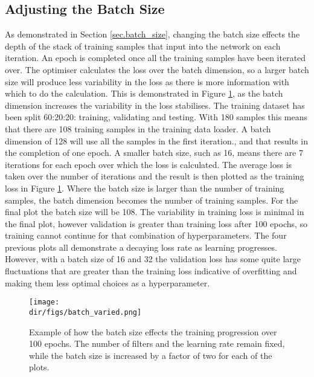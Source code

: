 \subsection{Adjusting the Batch Size}
As demonstrated in Section \ref{sec.batch_size}, changing the batch size effects the depth of the stack of training samples that input into the network on each iteration. An epoch is completed once all the training samples have been iterated over. The optimiser calculates the loss over the batch dimension, so a larger batch size will produce less variability in the loss as there is more information with which to do the calculation. This is demonstrated in Figure \ref{fig.batch_varied}, as the batch dimension increases the variability in the loss stabilises. The training dataset has been split 60:20:20: training, validating and testing. With 180 samples this means that there are 108 training samples in the training data loader. A batch dimension of 128 will use all the samples in the first iteration., and that results in the completion of one epoch. A smaller batch size, such as 16, means there are 7 iterations for each epoch over which the loss is calculated. The average loss is taken over the number of iterations and the result is then plotted as the training loss in Figure \ref{fig.batch_varied}. Where the batch size is larger than the number of training samples, the batch dimension becomes the number of training samples. For the final plot the batch size will be 108. The variability in training loss is minimal in the final plot, however validation is greater than training loss after 100 epochs, so training cannot continue for that combination of hyperparameters. The four previous plots all demonstrate a decaying loss rate as learning progresses. However, with a batch size of 16 and 32 the validation loss has some quite large fluctuations that are greater than the training loss indicative of overfitting and making them less optimal choices as a hyperparameter. 
\begin{figure}[htpb]
    \centering
    \texttt{[image: \\dir/figs/batch\_varied.png]}
    \caption[Example of the effect of changing the batch size]{Example of how the batch size effects the training progression over 100 epochs. The number of filters and the learning rate remain fixed, while the batch size is increased by a factor of two for each of the plots.}
    \label{fig.batch_varied}
\end{figure}
